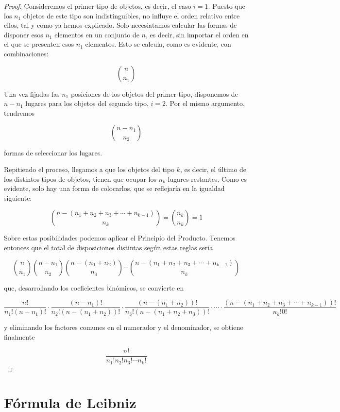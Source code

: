 \begin{proof}
  Consideremos el primer tipo de objetos, es decir, el caso $i = 1$. Puesto
  que los $n_1$ objetos de este tipo son indistinguibles, no influye el
  orden relativo entre ellos, tal y como ya hemos explicado. Solo
  necesiatamos calcular las formas de disponer esos $n_1$ elementos en un
  conjunto de $n$, es decir, sin importar el orden en el que se presenten
  esos $n_1$ elementos. Esto se calcula, como es evidente, con
  combinaciones:

  $$ {n \choose n_1} $$

  Una vez fijadas las $n_1$ posiciones de los objetos del primer tipo,
  disponemos de $n - n_1$ lugares para los objetos del segundo tipo, $i =
  2$. Por el mismo argumento, tendremos

  $$ {n - n_1 \choose n_2} $$

  \noindent formas de seleccionar los lugares.

  Repitiendo el proceso, llegamos a que los objetos del tipo $k$, es decir,
  el último de los distintos tipos de objetos, tienen que ocupar los $n_k$
  lugares restantes. Como es evidente, solo hay una forma de colocarlos, que
  se reflejaría en la igualdad siguiente:

  $$ {n - (n_1 + n_2 + n_3 + \cdots + n_{k-1}) \choose n_k} = {n_k \choose
  n_k} = 1 $$

  Sobre estas posibilidades podemos aplicar el Principio del Producto.
  Tenemos entonces que el total de disposiciones distintas según estas
  reglas sería

  $$ {n \choose n_1} {n - n_1 \choose n_2} {n - (n_1 + n_2) \choose n_3}
  \cdots {n - (n_1 + n_2 + n_3 + \cdots + n_{k-1}) \choose n_k} $$

  \noindent que, desarrollando los coeficientes binómicos, se convierte en

  $$ \frac{n!}{{n_1}! (n - n_1)!} \cdot \frac{(n - n_1)!}{{n_2}! (n - (n_1 +
  n_2))!} \cdot \frac{(n - (n_1 + n_2))!}{{n_3}! (n - (n_1 + n_2 + n_3))!}
  \cdot \cdots \cdot \frac{(n - (n_1 + n_2 + n_3 + \cdots +
  n_{k-1}))!}{{n_k}! 0!} $$

  \noindent y eliminando los factores comunes en el numerador y el
  denominador, se obtiene finalmente

  $$ \frac{n!}{{n_1}! {n_2}! {n_3}! \cdots {n_k}!} $$
\end{proof}





\section{Fórmula de Leibniz}

